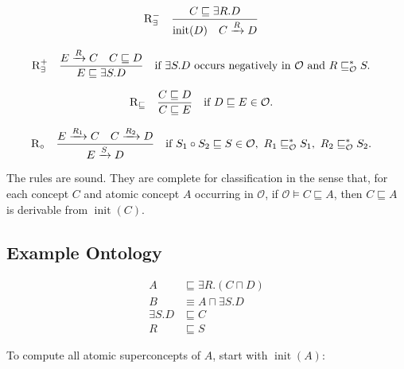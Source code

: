 \documentclass[11pt]{article}
\newcommand{\Ont}{\mathcal O}
\newcommand{\sub}{\sqsubseteq}
\newcommand{\equivc}{\equiv}
\newcommand{\compose}{\circ}
\newcommand{\init}{\operatorname{init}}
\begin{document}
\begin{align*}
\textsc{R}_{\exists}^{-} \quad&
\frac{C \sub \exists R.D}{\init(D) \quad C \xrightarrow{R} D}
\end{align*}

\begin{align*}
\textsc{R}_{\exists}^{+} \quad&
\frac{E \xrightarrow{R} C \quad C \sub D}{E \sub \exists S.D}
\quad \text{if } \exists S.D \text{ occurs negatively in } \Ont \text{ and } R \sub^{*}_{\Ont} S.
\end{align*}

\begin{align*}
\textsc{R}_{\sub} \quad&
\frac{C \sub D}{C \sub E}
\quad \text{if } D \sub E \in \Ont.
\end{align*}

\begin{align*}
\textsc{R}_{\compose} \quad&
\frac{E \xrightarrow{R_1} C \quad C \xrightarrow{R_2} D}{E \xrightarrow{S} D}
\quad \text{if } S_1 \compose S_2 \sub S \in \Ont,\ R_1 \sub^{*}_{\Ont} S_1,\ R_2 \sub^{*}_{\Ont} S_2.
\end{align*}

The rules are sound. They are complete for classification in the sense that, for each concept $C$ and atomic concept $A$ occurring in $\Ont$, if $\Ont \models C \sub A$, then $C \sub A$ is derivable from $\init(C)$.

\subsection{Example Ontology}

\begin{align}
A &\sub \exists R.(C \sqcap D) \tag{1}\\
B &\equivc A \sqcap \exists S.D \tag{2}\\
\exists S.D &\sub C \tag{3}\\
R &\sub S \tag{4}
\end{align}

To compute all atomic superconcepts of $A$, start with $\init(A)$:
\end{document}
